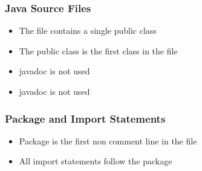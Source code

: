 \subsubsection{Java Source Files}
\begin{itemize}
\item The file contains  a single public class
\item The public class is the first class in the file
\item javadoc is not used
\item javadoc is not used
\end{itemize}

\subsubsection{Package and Import Statements}
\begin{itemize}
\item Package is the first non comment line in the file
\item All import statements follow the package
\end{itemize}

